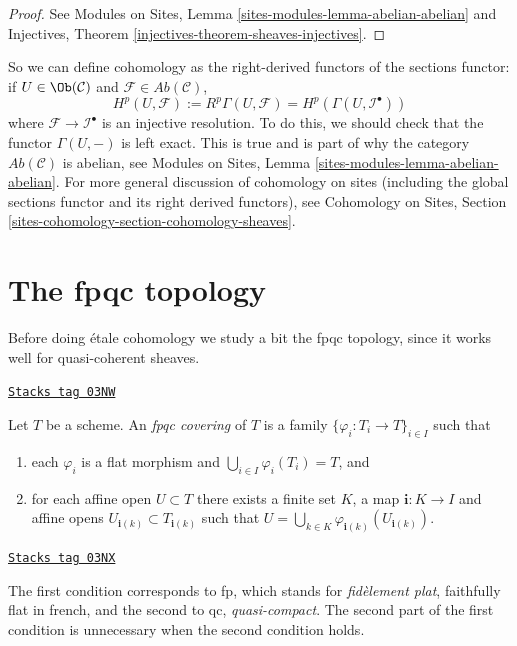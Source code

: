 \begin{proof}
See
Modules on Sites, Lemma \ref{sites-modules-lemma-abelian-abelian} and
Injectives, Theorem \ref{injectives-theorem-sheaves-injectives}.
\end{proof}

So we can define cohomology as the right-derived functors of the
sections functor: if $U \in \Ob(\mathcal{C})$ and
$\mathcal{F} \in \textit{Ab}(\mathcal{C})$,
$$
H^p(U, \mathcal{F}) :=
R^p\Gamma(U, \mathcal{F}) =
H^p(\Gamma(U, \mathcal{I}^\bullet))
$$
where $\mathcal{F} \to \mathcal{I}^\bullet$ is an injective resolution. To do
this, we should check that the functor $\Gamma(U, -)$ is left exact. This is
true and is part of why the category $\textit{Ab}(\mathcal{C})$ is abelian,
see
Modules on Sites, Lemma \ref{sites-modules-lemma-abelian-abelian}.
For more general discussion of cohomology on sites (including the
global sections functor and its right derived functors), see
Cohomology on Sites, Section \ref{sites-cohomology-section-cohomology-sheaves}.

\section{The fpqc topology}
\label{etale-cohomology-section-fpqc}

Before doing \'etale cohomology we study a bit the fpqc topology, since
it works well for quasi-coherent sheaves.

\begin{definition}
\label{etale-cohomology-definition-fpqc-covering}
\href{https://stacks.math.columbia.edu/tag/03NW}{\texttt{Stacks tag 03NW}}

Let $T$ be a scheme. An {\it fpqc covering} of $T$ is a family
$\{ \varphi_i : T_i \to T\}_{i \in I}$ such that
\begin{enumerate}
\item each $\varphi_i$ is a flat morphism and
$\bigcup_{i\in I} \varphi_i(T_i) = T$, and
\item for each affine open $U \subset T$ there exists a finite
set $K$, a map $\mathbf{i} : K \to I$ and affine opens
$U_{\mathbf{i}(k)} \subset T_{\mathbf{i}(k)}$ such that
$U = \bigcup_{k \in K} \varphi_{\mathbf{i}(k)}(U_{\mathbf{i}(k)})$.
\end{enumerate}
\end{definition}

\begin{remark}[Fpqc]
\label{etale-cohomology-remark-fpqc}
\href{https://stacks.math.columbia.edu/tag/03NX}{\texttt{Stacks tag 03NX}}

The first condition corresponds to fp, which stands for
{\it fid\`element plat}, faithfully flat in french, and
the second to qc, {\it quasi-compact}. The second part of
the first condition is unnecessary when the second condition holds.
\end{remark}

